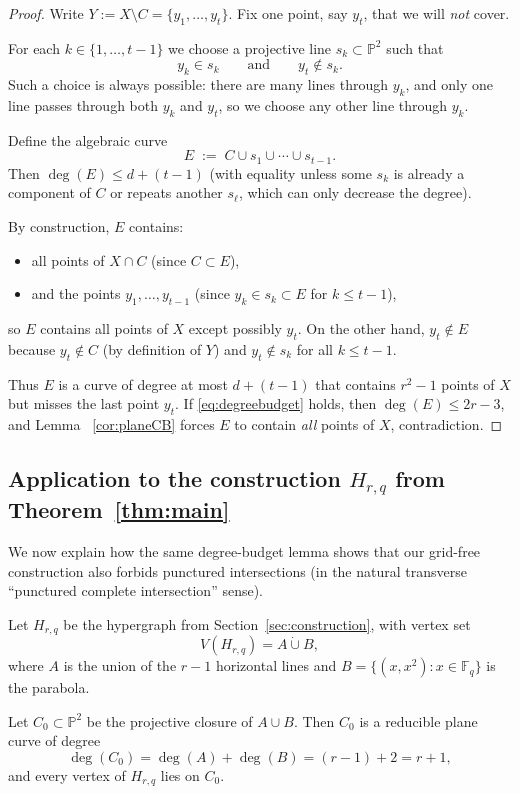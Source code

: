 \documentclass[11pt]{article}
\theoremstyle{definition}
\theoremstyle{remark}
\newcommand{\F}{\mathbb{F}}
\newcommand{\PP}{\mathbb{P}}
\begin{document}
\begin{proof}
Write $Y:=X\setminus C=\{y_1,\dots,y_t\}$.
Fix one point, say $y_t$, that we will \emph{not} cover.

For each $k\in\{1,\dots,t-1\}$ we choose a projective line $s_k\subset\PP^2$ such that
\[
y_k\in s_k
\qquad\text{and}\qquad
y_t\notin s_k.
\]
Such a choice is always possible: there are many lines through $y_k$, and only one line passes through both $y_k$ and $y_t$,
so we choose any other line through $y_k$.

Define the algebraic curve
\[
E \;:=\; C \cup s_1\cup\cdots\cup s_{t-1}.
\]
Then $\deg(E)\le d+(t-1)$ (with equality unless some $s_k$ is already a component of $C$ or repeats another $s_\ell$,
which can only decrease the degree).

By construction, $E$ contains:
\begin{itemize}[leftmargin=2em]
\item all points of $X\cap C$ (since $C\subset E$),
\item and the points $y_1,\dots,y_{t-1}$ (since $y_k\in s_k\subset E$ for $k\le t-1$),
\end{itemize}
so $E$ contains all points of $X$ except possibly $y_t$.
On the other hand, $y_t\notin E$ because $y_t\notin C$ (by definition of $Y$) and $y_t\notin s_k$ for all $k\le t-1$.

Thus $E$ is a curve of degree at most $d+(t-1)$ that contains $r^2-1$ points of $X$ but misses the last point $y_t$.
If \eqref{eq:degreebudget} holds, then $\deg(E)\le 2r-3$, and Lemma ~\ref{cor:planeCB} forces $E$ to contain \emph{all} points of $X$, contradiction.
\end{proof}

\subsection{Application to the construction $H_{r,q}$ from Theorem~\ref{thm:main}}

We now explain how the same degree-budget lemma shows that our grid-free construction also forbids
punctured intersections (in the natural transverse ``punctured complete intersection'' sense).

Let $H_{r,q}$ be the hypergraph from Section~\ref{sec:construction}, with vertex set
\[
V(H_{r,q})=A\dot\cup B,
\]
where $A$ is the union of the $r-1$ horizontal lines and $B=\{(x,x^2):x\in\F_q\}$ is the parabola.

Let $C_0\subset\PP^2$ be the projective closure of $A\cup B$.
Then $C_0$ is a reducible plane curve of degree
\[
\deg(C_0)=\deg(A)+\deg(B)=(r-1)+2=r+1,
\]
and every vertex of $H_{r,q}$ lies on $C_0$.
\end{document}

